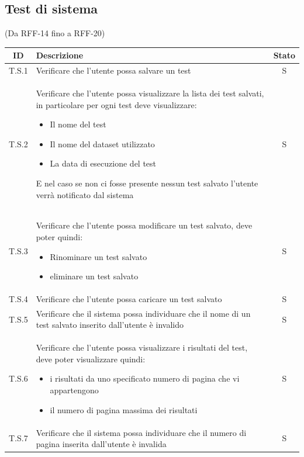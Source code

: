 
\subsection{Test di sistema}
(Da RFF-14 fino a RFF-20)
\begin{tabularx}{\textwidth}{|c|X|c|}
    \hline
    \textbf{ID} & \textbf{Descrizione} & \textbf{Stato}\\
    \hline
    \label{ts:ts1} T.S.1 & Verificare che l’utente possa salvare un test & S\\
    \hline
    \label{ts:ts2} T.S.2 & 
    Verificare che l’utente possa visualizzare la lista dei test salvati, in particolare per ogni test deve visualizzare:
    \begin{itemize}
        \item Il nome del test
        \item Il nome del dataset utilizzato
        \item La data di esecuzione del test
    \end{itemize} 
    E nel caso se non ci fosse presente nessun test salvato l’utente verrà notificato dal sistema
    & S\\
    \hline
    \label{ts:ts3} T.S.3 & 
    Verificare che l’utente possa modificare un test salvato, deve poter quindi:  
    \begin{itemize}
        \item Rinominare un test salvato
        \item eliminare un test salvato
    \end{itemize} 
    & S\\
    \hline
    \label{ts:ts4} T.S.4 & Verificare che l’utente possa caricare un test salvato & S\\
    \hline
    \label{ts:ts5} T.S.5 & Verificare che il sistema possa individuare che il nome di un test salvato inserito dall’utente è invalido & S\\
    \hline
    \label{ts:ts6} T.S.6 & 
    Verificare che l'utente possa visualizzare i risultati del test, deve poter visualizzare quindi: 
    \begin{itemize}
        \item i risultati da uno specificato numero di pagina che vi appartengono
        \item il numero di pagina massima dei risultati
    \end{itemize} 
    & S\\
    \hline
    \label{ts:ts7} T.S.7 & Verificare che il sistema possa individuare che il numero di pagina inserita dall’utente è invalida & S\\

\end{tabularx}

